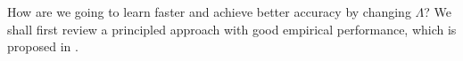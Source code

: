 \documentclass{article}
\newcommand\eg{\textit{e.g.}}
\begin{document}
\par
How are we going to learn faster and achieve better accuracy by changing $\Lambda$? We shall first review a principled approach with good empirical performance, which is proposed in \cite{white2016greedy}.
\end{document}
